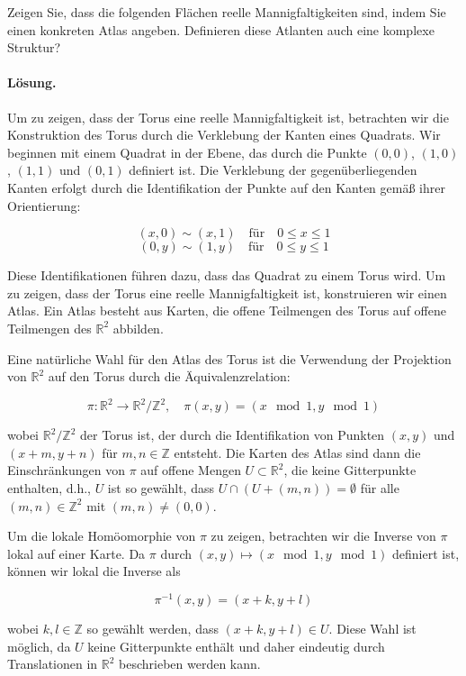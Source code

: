 \documentclass[11pt,a4paper]{article}
\begin{document}
Zeigen Sie, dass die folgenden Flächen reelle Mannigfaltigkeiten sind, indem Sie einen konkreten Atlas angeben. Definieren diese Atlanten auch eine komplexe Struktur?

\paragraph{Lösung.}
Um zu zeigen, dass der Torus eine reelle Mannigfaltigkeit ist, betrachten wir die Konstruktion des Torus durch die Verklebung der Kanten eines Quadrats. Wir beginnen mit einem Quadrat in der Ebene, das durch die Punkte \( (0,0) \), \( (1,0) \), \( (1,1) \) und \( (0,1) \) definiert ist. Die Verklebung der gegenüberliegenden Kanten erfolgt durch die Identifikation der Punkte auf den Kanten gemäß ihrer Orientierung:

\[
(x,0) \sim (x,1) \quad \text{für} \quad 0 \leq x \leq 1
\]
\[
(0,y) \sim (1,y) \quad \text{für} \quad 0 \leq y \leq 1
\]

Diese Identifikationen führen dazu, dass das Quadrat zu einem Torus wird. Um zu zeigen, dass der Torus eine reelle Mannigfaltigkeit ist, konstruieren wir einen Atlas. Ein Atlas besteht aus Karten, die offene Teilmengen des Torus auf offene Teilmengen des \(\mathbb{R}^2\) abbilden.

Eine natürliche Wahl für den Atlas des Torus ist die Verwendung der Projektion von \(\mathbb{R}^2\) auf den Torus durch die Äquivalenzrelation:

\[
\pi: \mathbb{R}^2 \to \mathbb{R}^2 / \mathbb{Z}^2, \quad \pi(x,y) = (x \mod 1, y \mod 1)
\]

wobei \(\mathbb{R}^2 / \mathbb{Z}^2\) der Torus ist, der durch die Identifikation von Punkten \((x,y)\) und \((x+m, y+n)\) für \(m, n \in \mathbb{Z}\) entsteht. Die Karten des Atlas sind dann die Einschränkungen von \(\pi\) auf offene Mengen \(U \subset \mathbb{R}^2\), die keine Gitterpunkte enthalten, d.h., \(U\) ist so gewählt, dass \(U \cap (U + (m,n)) = \emptyset\) für alle \((m,n) \in \mathbb{Z}^2\) mit \((m,n) \neq (0,0)\).

Um die lokale Homöomorphie von \(\pi\) zu zeigen, betrachten wir die Inverse von \(\pi\) lokal auf einer Karte. Da \(\pi\) durch \((x,y) \mapsto (x \mod 1, y \mod 1)\) definiert ist, können wir lokal die Inverse als

\[
\pi^{-1}(x,y) = (x+k, y+l)
\]

wobei \(k, l \in \mathbb{Z}\) so gewählt werden, dass \((x+k, y+l) \in U\). Diese Wahl ist möglich, da \(U\) keine Gitterpunkte enthält und daher eindeutig durch Translationen in \(\mathbb{R}^2\) beschrieben werden kann.
\end{document}
